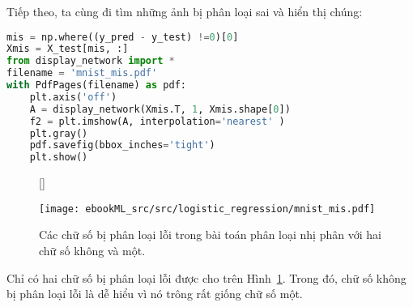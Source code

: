 Tiếp theo, ta cùng đi tìm những ảnh bị phân loại sai và hiển thị chúng:
\begin{lstlisting}[language=Python]
mis = np.where((y_pred - y_test) !=0)[0]
Xmis = X_test[mis, :]
from display_network import * 
filename = 'mnist_mis.pdf'
with PdfPages(filename) as pdf:
    plt.axis('off')
    A = display_network(Xmis.T, 1, Xmis.shape[0])
    f2 = plt.imshow(A, interpolation='nearest' )
    plt.gray()
    pdf.savefig(bbox_inches='tight')
    plt.show()
\end{lstlisting}

\begin{figure}[t]
   
    [\FBwidth]
    {\caption{ 
    Các chữ số bị phân loại lỗi trong bài toán phân loại nhị phân với hai chữ số không và một. 
    }
    \label{fig:10_mnist_miss}}
    { %
    \texttt{[image: ebookML\_src/src/logistic\_regression/mnist\_mis.pdf]}
    }
\end{figure}
Chỉ có hai chữ số bị phân loại lỗi được cho trên Hình~\ref{fig:10_mnist_miss}.
Trong đó, chữ số không bị phân loại lỗi là dễ hiểu vì nó trông rất giống chữ số một. 

 

